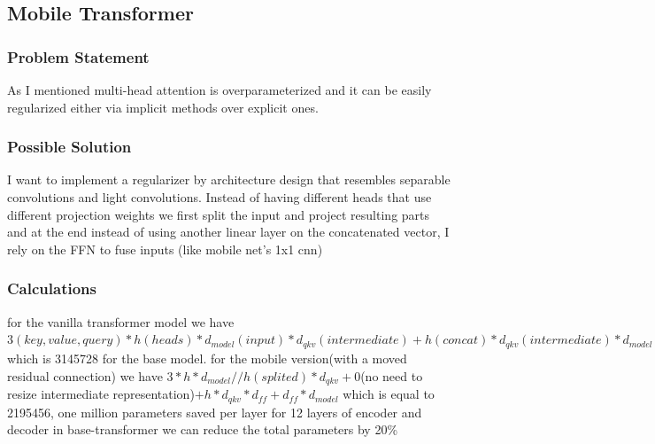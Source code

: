 \documentclass{article}
\begin{document}
\subsection{Mobile Transformer}
\subsubsection{Problem Statement}
As I mentioned multi-head attention is overparameterized and it can be easily regularized either via implicit methods over explicit ones.

\subsubsection{Possible Solution}
I want to implement a regularizer by architecture design that resembles separable convolutions\citep{1704.04861} and light convolutions\citep{1901.10430}. Instead of having different heads that use different projection weights we first split the input and project resulting parts and at the end instead of using another linear layer on the concatenated vector, I rely on the FFN to fuse inputs (like mobile net's 1x1 cnn)

\subsubsection{Calculations}
for the vanilla transformer model we have $3(key, value, query) * h(heads) * d_{model}(input) * d_{qkv}(intermediate) + h(concat) * d_{qkv}(intermediate) * d_{model}(final) + d_{model}(ffn_{input}) * d_{ff}(intermediate) + d_{ff} * d_{model}(final)$ which is 3145728 for the base model.
for the mobile version(with a moved residual connection) we have $3 * h * d_{model} // h(splited) * d_{qkv} + 0$(no need to resize intermediate representation)$+ h * d_{qkv} * d_{ff} + d_{ff} * d_{model}$ which is equal to 2195456, one million parameters saved per layer for 12 layers of encoder and decoder in base-transformer we can reduce the total parameters by 20\%


\end{document}
